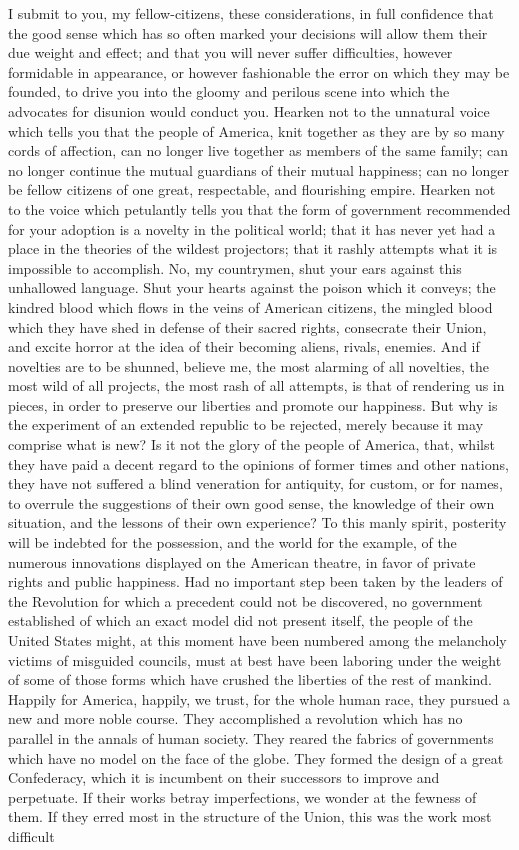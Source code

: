 I submit to you, my fellow-citizens, these considerations, in full confidence that the good sense which has so often marked your decisions will allow them their due weight and effect; and that you will never suffer difficulties, however formidable in appearance, or however fashionable the error on which they may be founded, to drive you into the gloomy and perilous scene into which the advocates for disunion would conduct you. Hearken not to the unnatural voice which tells you that the people of America, knit together as they are by so many cords of affection, can no longer live together as members of the same family; can no longer continue the mutual guardians of their mutual happiness; can no longer be fellow citizens of one great, respectable, and flourishing empire. Hearken not to the voice which petulantly tells you that the form of government recommended for your adoption is a novelty in the political world; that it has never yet had a place in the theories of the wildest projectors; that it rashly attempts what it is impossible to accomplish. No, my countrymen, shut your ears against this unhallowed language. Shut your hearts against the poison which it conveys; the kindred blood which flows in the veins of American citizens, the mingled blood which they have shed in defense of their sacred rights, consecrate their Union, and excite horror at the idea of their becoming aliens, rivals, enemies. And if novelties are to be shunned, believe me, the most alarming of all novelties, the most wild of all projects, the most rash of all attempts, is that of rendering us in pieces, in order to preserve our liberties and promote our happiness. But why is the experiment of an extended republic to be rejected, merely because it may comprise what is new? Is it not the glory of the people of America, that, whilst they have paid a decent regard to the opinions of former times and other nations, they have not suffered a blind veneration for antiquity, for custom, or for names, to overrule the suggestions of their own good sense, the knowledge of their own situation, and the lessons of their own experience? To this manly spirit, posterity will be indebted for the possession, and the world for the example, of the numerous innovations displayed on the American theatre, in favor of private rights and public happiness. Had no important step been taken by the leaders of the Revolution for which a precedent could not be discovered, no government established of which an exact model did not present itself, the people of the United States might, at this moment have been numbered among the melancholy victims of misguided councils, must at best have been laboring under the weight of some of those forms which have crushed the liberties of the rest of mankind. Happily for America, happily, we trust, for the whole human race, they pursued a new and more noble course. They accomplished a revolution which has no parallel in the annals of human society. They reared the fabrics of governments which have no model on the face of the globe. They formed the design of a great Confederacy, which it is incumbent on their successors to improve and perpetuate. If their works betray imperfections, we wonder at the fewness of them. If they erred most in the structure of the Union, this was the work most difficult 